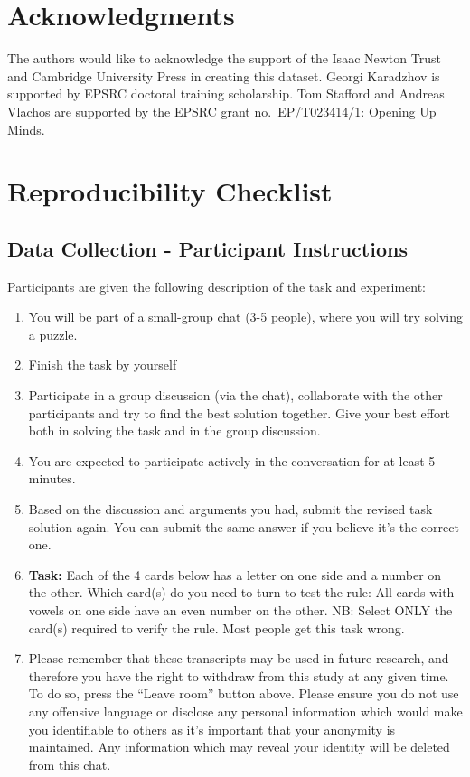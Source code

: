 \documentclass[acmsmall,manuscript,screen]{acmart}
\begin{document}
\section*{Acknowledgments}

The authors would like to acknowledge the support of the Isaac Newton Trust and Cambridge University Press in creating this dataset. Georgi Karadzhov is supported by EPSRC doctoral training scholarship. Tom Stafford and Andreas Vlachos are supported by the EPSRC grant no.\ EP/T023414/1: Opening Up Minds.





\appendix

\clearpage

\section{Reproducibility Checklist}
\subsection{Data Collection - Participant Instructions}
\label{app:reproducibility_insructions}
Participants are given the following description of the task and experiment:

\begin{enumerate}
\item You will be part of a small-group chat (3-5 people), where you will try solving a puzzle.
\item Finish the task by yourself
\item Participate in a group discussion (via the chat), collaborate with the other participants and try to find the best solution together. Give your best effort both in solving the task and in the group discussion.
\item You are expected to participate actively in the conversation for at least 5 minutes.

\item Based on the discussion and arguments you had, submit the revised task solution again. You can submit the same answer if you believe it's the correct one.

\item \textbf{Task:} Each of the 4 cards below has a letter on one side and a number on the other. Which card(s) do you need to turn to test the rule:
All cards with vowels on one side have an even number on the other.
NB: Select ONLY the card(s) required to verify the rule. Most people get this task wrong.

\item Please remember that these transcripts may be used in future research, and therefore you have the right to withdraw from this study at any given time. To do so, press the ``Leave room'' button above. Please ensure you do not use any offensive language or disclose any personal information which would make you identifiable to others as it’s important that your anonymity is maintained. Any information which may reveal your identity will be deleted from this chat.
\end{enumerate}
\end{document}
